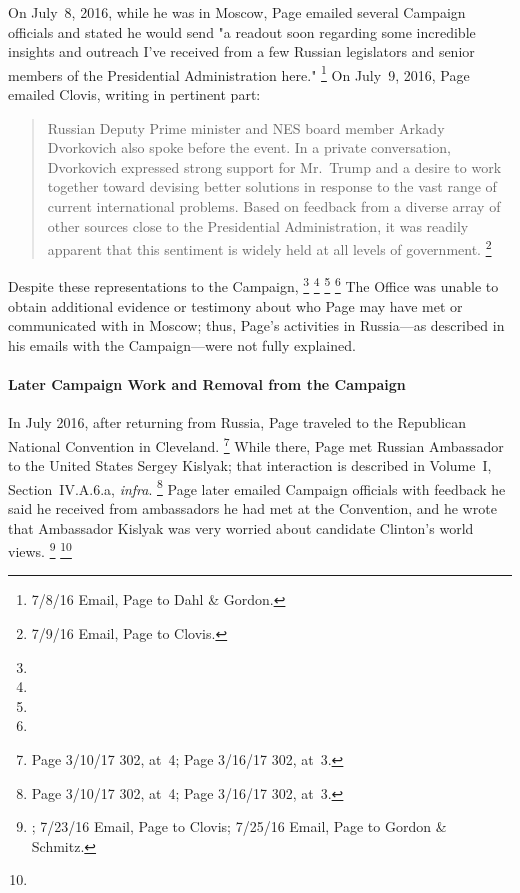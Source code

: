 On July~8, 2016, while he was in Moscow, Page emailed several Campaign officials and stated he would send "a readout soon regarding some incredible insights and outreach I've received from a few Russian legislators and senior members of the Presidential Administration here."%
\footnote{ 7/8/16 Email, Page to Dahl \& Gordon.}
On July~9, 2016, Page emailed Clovis, writing in pertinent part:

\begin{quote}
Russian Deputy Prime minister and NES board member Arkady Dvorkovich also spoke before the event.
In a private conversation, Dvorkovich expressed strong support for Mr.~Trump and a desire to work together toward devising better solutions in response to the vast range of current international problems.
Based on feedback from a diverse array of other sources close to the Presidential Administration, it was readily apparent that this sentiment is widely held at all levels of government.%
\footnote{ 7/9/16 Email, Page to Clovis.}
\end{quote}

Despite these representations to the Campaign,
\footnote{}
\footnote{}
\footnote{}
\footnote{}
The Office was unable to obtain additional evidence or testimony about who Page may have met or communicated with in Moscow; thus, Page's activities in Russia---as described in his emails with the Campaign---were not fully explained.

\paragraph{Later Campaign Work and Removal from the Campaign}

In July 2016, after returning from Russia, Page traveled to the Republican National Convention in Cleveland.%
\footnote{Page 3/10/17 302, at~4;
Page 3/16/17 302, at~3.}
While there, Page met Russian Ambassador to the United States Sergey Kislyak; that interaction is described in Volume~I, Section~IV.A.6.a, \textit{infra}.%
\footnote{Page 3/10/17 302, at~4;
Page 3/16/17 302, at~3.}
Page later emailed Campaign officials with feedback he said he received from ambassadors he had met at the Convention, and he wrote that Ambassador Kislyak was very worried about candidate Clinton's world views.%
\footnote{; 7/23/16 Email, Page to Clovis;
7/25/16 Email, Page to Gordon \& Schmitz.}
\footnote{}

